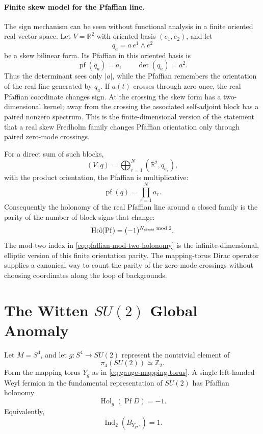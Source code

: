 \paragraph{Finite skew model for the Pfaffian line.}
The sign mechanism can be seen without functional analysis in a finite
oriented real vector space.  Let \(V=\mathbb R^2\) with oriented basis
\((e_1,e_2)\), and let
\[
  q_a=a\,e^1\wedge e^2
\]
be a skew bilinear form.  Its Pfaffian in this oriented basis is
\begin{equation}
  \operatorname{pf}(q_a)=a,
  \qquad
  \det(q_a)=a^2 .
  \label{eq:finite-pfaffian-block}
\end{equation}
Thus the determinant sees only \(|a|\), while the Pfaffian remembers the
orientation of the real line generated by \(q_a\).  If \(a(t)\) crosses
through zero once, the real Pfaffian coordinate changes sign.  At the
crossing the skew form has a two-dimensional kernel; away from the crossing
the associated self-adjoint block has a paired nonzero spectrum.  This is the
finite-dimensional version of the statement that a real skew Fredholm family
changes Pfaffian orientation only through paired zero-mode crossings.

For a direct sum of such blocks,
\[
  (V,q)=\bigoplus_{r=1}^{N}(\mathbb R^2,q_{a_r}),
\]
with the product orientation, the Pfaffian is multiplicative:
\begin{equation}
  \operatorname{pf}(q)=\prod_{r=1}^{N}a_r .
  \label{eq:finite-pfaffian-block-product}
\end{equation}
Consequently the holonomy of the real Pfaffian line around a closed family is
the parity of the number of block signs that change:
\begin{equation}
  \operatorname{Hol}(\operatorname{Pf})
  =
  (-1)^{N_{\rm cross}\bmod2}.
  \label{eq:finite-pfaffian-crossing-parity}
\end{equation}
The mod-two index in \eqref{eq:pfaffian-mod-two-holonomy} is the
infinite-dimensional, elliptic version of this finite orientation parity.
The mapping-torus Dirac operator supplies a canonical way to count the parity
of the zero-mode crossings without choosing coordinates along the loop of
backgrounds.

\section{\texorpdfstring{The Witten \(SU(2)\) Global Anomaly}{The Witten SU(2) Global Anomaly}}

Let \(M=S^4\), and let \(g:S^4\to SU(2)\) represent the nontrivial element of
\[
  \pi_4(SU(2))\simeq\mathbb Z_2 .
\]
Form the mapping torus \(Y_g\) as in \eqref{eq:gauge-mapping-torus}.  A
single left-handed Weyl fermion in the fundamental representation of
\(SU(2)\) has Pfaffian holonomy
\begin{equation}
  \operatorname{Hol}_g(\operatorname{Pf}D)=-1 .
  \label{eq:witten-su2-fundamental-sign}
\end{equation}
Equivalently,
\begin{equation}
  \operatorname{Ind}_2(B_{Y_g,\square})=1 .
  \label{eq:witten-su2-fundamental-mod-two-index}
\end{equation}

